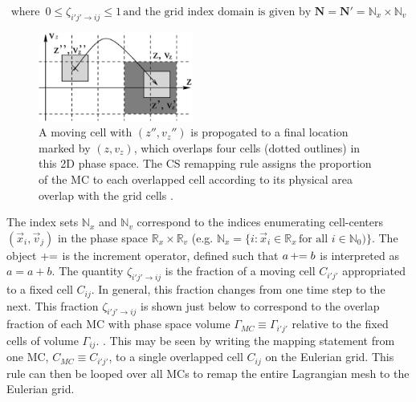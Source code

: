 \documentclass[11pt,titlepage]{report}
\begin{document}
$$\textrm{where }\, 0 \leq\zeta_{i'j'\to ij}\leq 1 \, \textrm{and the grid index domain is given by } \boldsymbol{N} = \boldsymbol{N}' = \mathbb{N}_x \times \mathbb{N}_v$$

\begin{figure}[h!]
  \centering
    \includegraphics[width=0.45\textwidth]{graphics/remap_rule}
  \caption{A moving cell  with $(z'',v_z'')$ is propogated to a final location marked by $(z,v_z)$, which overlaps four cells (dotted outlines) in this 2D phase space. The CS remapping rule assigns the proportion of the MC to each overlapped cell according to its physical area overlap with the grid cells \cite[p.3162]{Feng00}.}
  \label{fig:remap_rule}
\end{figure}

\noindent The index sets $\mathbb{N}_x$ and $\mathbb{N}_v$ correspond to the indices enumerating cell-centers $(\vec{x}_i,\vec{v}_j)$ in the phase space $\mathbb{R}_x\times\mathbb{R}_v$ (e.g. $\mathbb{N}_x = \{i \colon \vec{x}_i\in\mathbb{R}_x \,\text{for all } i\in\mathbb{N}_0)\}$. The object $+\hspace{-.3em}=$ is the increment operator, defined such that $a\, +\hspace{-.3em}= b$ is interpreted as $a = a + b$. The quantity $\zeta_{i'j'\to ij}$ is the fraction of a moving cell $C_{i'j'}$ appropriated to a fixed cell $C_{ij}$. In general, this fraction changes from one time step to the next. This fraction $\zeta_{i'j'\to ij}$ is shown just below to correspond to the overlap fraction of each MC with phase space volume $\Gamma_{MC} \equiv \Gamma_{i'j'}$ relative to the fixed cells of volume $\Gamma_{ij}$. \cite{Birdsall69,Guclu12,Hitchon89}. This may be seen by writing the mapping statement from one MC, $C_{MC} \equiv C_{i'j'}$, to a single overlapped cell $C_{ij}$ on the Eulerian grid. This rule can then be looped over all MCs to remap the entire Lagrangian mesh to the Eulerian grid.
\end{document}

